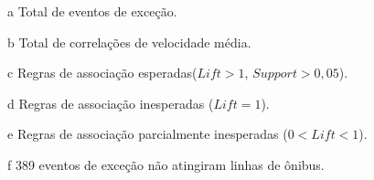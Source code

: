 \documentclass[
	12pt,				%
	oneside,			%
	a4paper,			%
	english,			%
	brazil				%
	]{abntex2ppgsi}
\begin{document}
{{\begin{apendicesenv}
\begin{table}[!htb]
\begin{threeparttable}
\begin{tablenotes}
            \item[a] Total de eventos de exceção.
            \item[b] Total de correlações de velocidade média.
            \item[c] Regras de associação esperadas($Lift > 1$, $Support > 0,05$).
            \item[d] Regras de associação inesperadas ($Lift = 1$).
            \item[e] Regras de associação parcialmente inesperadas ($0 < Lift < 1$).
            \item[f] 389 eventos de exceção não atingiram linhas de ônibus.
        \end{tablenotes}
\end{threeparttable}
\end{table}


\end{apendicesenv}}}
\end{document}
